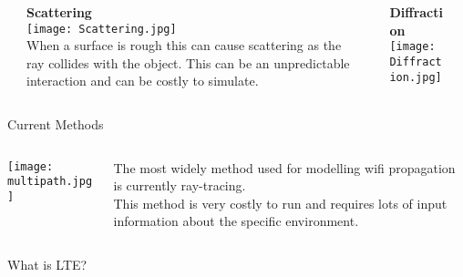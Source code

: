 \documentclass[final]{beamer}
\theoremstyle{plain}
\theoremstyle{definition}
\theoremstyle{remark}
\newlength{\twocolwid}
\begin{document}
\begin{frame}[t]
\begin{columns}[t]
\begin{column}{\twocolwid}
\begin{mdframed}[backgroundcolor=jblue!15, linecolor=jblue!70,
  linewidth=20pt,
  topline=true,
  rightline=true,
  leftline=true, bottomline=true, userdefinedwidth=0.999999\linewidth]
\begin{columns}
\begin{column}{0.05\linewidth}
\end{column}
\begin{column}{0.4\linewidth}
\textbf{Scattering} \\
\texttt{[image: Scattering.jpg]} 
\\ When a surface is rough this can cause scattering as the ray collides with the object. This can be an unpredictable interaction and can be costly to simulate.
\end{column}
\begin{column}{0.01\linewidth}
\end{column}
\begin{column}{0.4\linewidth}
\textbf{Diffraction} \\
\texttt{[image: Diffraction.jpg]} 
\end{column}
\begin{column}{0.05\linewidth}
\end{column}
\end{columns}
\end{mdframed}

\begin{block}{Current Methods}
\begin{columns}
\begin{column}{0.5\linewidth}
\texttt{[image: multipath.jpg]} \cite{Multipath} 
\end{column}
\begin{column}{0.5\linewidth}
The most widely method used for modelling wifi propagation is currently ray-tracing. 
\\ This method is very costly to run and requires lots of input information about the specific environment.
\end{column}
\end{columns}
\end{block}



\begin{alertblock}{What is LTE?}

\end{alertblock}
%	


\end{column}
\end{columns}
\end{frame}
\end{document}
